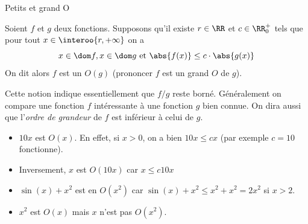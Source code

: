 \begin{frame}{Petits et grand O}%
  \begin{definition}
    Soient \(f\) et \(g\) deux fonctions. Supposons qu'il existe \(r \in \RR\) et \(c \in \RR_{0}^{+}\) tels que pour tout \(x \in \interoo{r,+\infty}\) on a
    \begin{equation*}
      x \in \dom f, x \in \dom g \text{ et } \abs{f(x)} \leq c\cdot \abs{g(x)}
    \end{equation*}
    On dit alors \og $f$ est un $O(g)$\fg{} (prononcer \og \(f\) est un grand $O$ de $g$\fg{}).
\end{definition}\pause

\begin{remark}
  Cette notion indique essentiellement que \(f/g\) reste borné. Généralement on compare une fonction \(f\) intéressante à une fonction \(g\) bien connue. On dira aussi que l'\emph{ordre de grandeur} de \(f\) est inférieur à celui de \(g\).
\end{remark}
\end{frame}
\begin{frame}%
\begin{example}
  \begin{itemize}
  \item \(10x\) est \(O(x)\). En effet, si \(x > 0\), on a bien \(10x \leq c x\) (par exemple \(c = 10\) fonctionne).

  \item Inversement, \(x\) est \(O(10x)\) car \(x \leq c 10x\)

  \item \(\sin(x) + x^{2}\) est en \(O(x^{2})\) car \(\sin(x) + x^{2} \leq x^{2} + x^{2} = 2 x^{2}\) si \(x > 2\).

  \item \(x^{2}\) est \(O(x)\) mais \(x\) n'est pas \(O(x^{2})\).
\end{itemize}
\end{example}
\end{frame}
